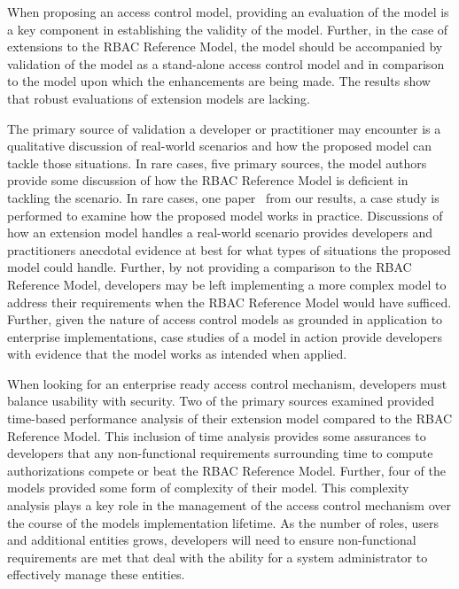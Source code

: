 When proposing an access control model, providing an evaluation of the model is a key component in establishing the validity of the model. 
Further, in the case of extensions to the RBAC Reference Model, the model should be accompanied by validation of the model as a stand-alone
access control model and in comparison to the model upon which the enhancements are being made. The results show that robust evaluations of
extension models are lacking. 

The primary source of validation a developer or practitioner may encounter is a qualitative discussion of real-world
scenarios and how the proposed model can tackle those situations. In rare cases, five primary sources, the model 
authors provide some discussion of how the RBAC Reference Model is deficient in tackling the scenario. In rare cases, 
one paper~\cite{motta03:contextual} from our results, a case study is performed to examine how the proposed model works in practice. Discussions
of how an extension model handles a real-world scenario provides developers and practitioners anecdotal evidence at best
for what types of situations the proposed model could handle. Further, by not providing a comparison to the RBAC Reference Model, developers may be left implementing a more complex model to address their requirements when the RBAC Reference Model would
have sufficed.  Further, given the nature of access control models as grounded in application to enterprise implementations, 
case studies of a model in action provide developers with evidence that the model works as intended when applied.

When looking for an enterprise ready access control mechanism, developers must balance usability with security. 
Two of the primary sources examined provided time-based performance analysis of their extension model compared
to the RBAC Reference Model. This inclusion of time analysis provides some assurances to developers that any non-functional
requirements surrounding time to compute authorizations compete or beat the RBAC Reference Model. Further, four of the models provided
some form of complexity of their model. This complexity analysis plays a key role in the management of the access control mechanism
over the course of the models implementation lifetime. As the number of roles, users and additional entities grows, developers will 
need to ensure non-functional requirements are met that deal with the ability for a system administrator to effectively manage these
entities.



